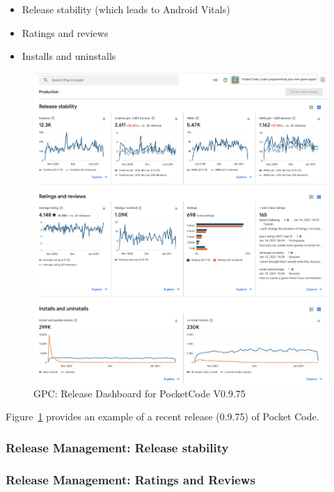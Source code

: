 \begin{itemize}
    \item Release stability (which leads to Android Vitals)
    \item Ratings and reviews
    \item Installs and uninstalls
\end{itemize}

\begin{figure}
    \centering
    \includegraphics[width=12cm]{images/google-play-console/gpc-release-dashboard-pocketcode-v0.9.75-on2021-01-15.png}
    \caption{GPC: Release Dashboard for PocketCode V0.9.75}
    \label{fig:gpc-release-dashboard-pocketcode-v0.9.75}
\end{figure}

Figure~\ref{fig:gpc-release-dashboard-pocketcode-v0.9.75} provides an example of a recent release (0.9.75) of Pocket Code.


\subsubsection{Release Management: Release stability}


\subsubsection{Release Management: Ratings and Reviews}


